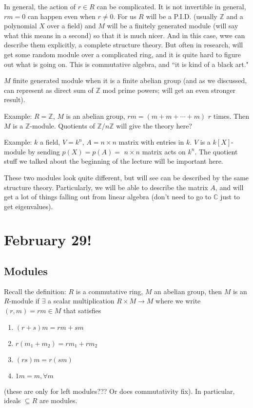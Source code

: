 \documentclass{article}
\theoremstyle{plain}
\theoremstyle{remark}
\newcommand{\Z}{{\mathbb Z}}
\newcommand{\C}{{\mathbb C}}
\begin{document}
In general, the action of $r \in R$ can be complicated.
It is not invertible in general, $rm = 0$ can happen even when $r \neq 0$.
For us $R$ will be a P.I.D. (usually $\Z$ and a polynomial $X$ over a field)
and $M$ will be a finitely generated module
(will say what this means in a second)
so that it is much nicer.
And in this case, wwe can describe them explicitly,
a complete structure theory.
But often in research, will get some random module over a complicated ring,
and it is quite hard to figure out what is going on.
This is commutative algebra, and ``it is kind of a black art."

$M$ finite generated module when it is a finite abelian group
(and as we discussed, can represent as direct sum of $\Z$ mod prime powers;
will get an even stronger result).

Example: $R = \Z$, $M$ is an abelian group,
$rm = (m + m + \cdots + m)$ $r$ times.
Then $M$ is a $\Z$-module.
Quotients of $\Z/n\Z$ will give the theory here?

Example: $k$ a field, $V = k^n$, $A = n \times n$ matrix with entries in $k$.
$V$ is a $k[X]$-module by sending $p(X) = p(A) = $
$n \times n$ matrix acts on $k^n$.
The quotient stuff we talked about the beginning of the lecture
will be important here.

These two modules look quite different,
but will see can be described by the same structure theory.
Particularly, we will be able to describe the matrix $A$,
and will get a lot of things falling out from linear algebra
(don't need to go to $\C$ just to get eigenvalues).


\section{February 29!}
\subsection{Modules}
Recall the definition:
$R$ is a commutative ring, $M$ an abelian group,
then $M$ is an $R$-module if $\exists$ a scalar multiplication
$R \times M \to M$ where we write $(r,m) = rm \in M$ that satisfies
\begin{enumerate}
	\item $(r+s)m = rm + sm$
	\item $r(m_1 + m_2) = rm_1 + rm_2$
	\item $(rs)m = r(sm)$
	\item $1m = m, \forall m$
\end{enumerate}
(these are only for left modules??? Or does commutativity fix).
In particular, ideals $\subseteq R$ are modules.
\end{document}
